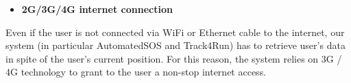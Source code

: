 \begin{itemize}
	\item \textbf{2G/3G/4G internet connection}
\end{itemize}
Even if the user is not connected via WiFi or Ethernet cable to the internet, our system (in particular AutomatedSOS and Track4Run) has to retrieve user's data in spite of the user's current position. For this reason, the system relies on 3G / 4G technology to grant to the user a non-stop internet access.